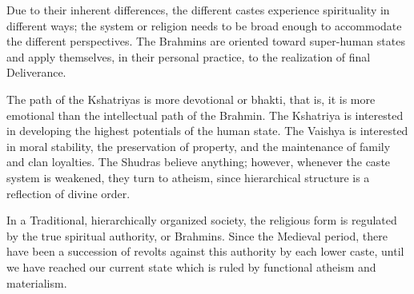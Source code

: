 Due to their inherent differences, the different castes experience spirituality in different ways; the system or religion needs to be broad enough to accommodate the different perspectives. The Brahmins are oriented toward super-human states and apply themselves, in their personal practice, to the realization of final Deliverance.

The path of the Kshatriyas is more devotional or bhakti, that is, it is more emotional than the intellectual path of the Brahmin. The Kshatriya is interested in developing the highest potentials of the human state. The Vaishya is interested in moral stability, the preservation of property, and the maintenance of family and clan loyalties. The Shudras believe anything; however, whenever the caste system is weakened, they turn to atheism, since hierarchical structure is a reflection of divine order.

In a Traditional, hierarchically organized society, the religious form is regulated by the true spiritual authority, or Brahmins. Since the Medieval period, there have been a succession of revolts against this authority by each lower caste, until we have reached our current state which is ruled by functional atheism and materialism.



